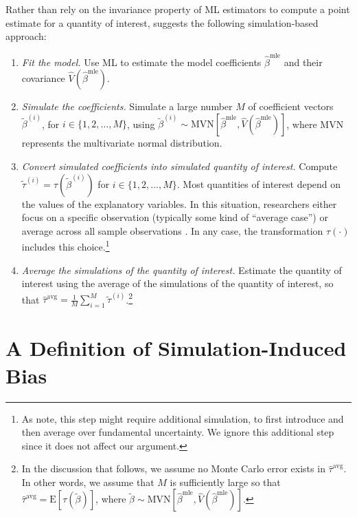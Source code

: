 \documentclass[11pt]{article}
\begin{document}
Rather than rely on the invariance property of ML estimators to compute a point estimate for a quantity of interest, \cite{KingTomzWittenberg2000} suggests the following simulation-based approach:\vspace{.1in}
\begin{enumerate}
\item \textit{Fit the model.}
Use ML to estimate the model coefficients $\hat{\beta}^{\text{mle}}$ and their covariance $\hat{V} \left( \hat{\beta}^{\text{mle}} \right)$.
\item \textit{Simulate the coefficients.}
Simulate a large number $M$ of coefficient vectors $\tilde{\beta}^{(i)}$, for $i \in \{1, 2,\ldots, M\}$, using $\tilde{\beta}^{(i)} \sim \text{MVN} \left[ \hat{\beta}^{\text{mle}}, \hat{V} \left( \hat{\beta}^{\text{mle}} \right) \right]$, where MVN represents the multivariate normal distribution.
\item \textit{Convert simulated coefficients into simulated quantity of interest.}
Compute $\tilde{\tau}^{(i)} = \tau \left( \tilde{\beta}^{(i)} \right)$ for $i \in \{1, 2,\ldots, M\}$.
Most quantities of interest depend on the values of the explanatory variables. In this situation, researchers either focus on a specific observation (typically some kind of ``average case'') or average across all sample observations \citep{HanmerKalkan2013}. In any case, the transformation $\tau(\cdot)$ includes this choice.\footnote{As \cite{KingTomzWittenberg2000} note, this step might require additional simulation, to first introduce and then average over fundamental uncertainty. We ignore this additional step since it does not affect our argument.} \item \textit{Average the simulations of the quantity of interest.} Estimate the quantity of interest using the average of the simulations of the quantity of interest, so that $\hat{\tau}^{\text{avg}} = \frac{1}{M} \sum_{i = 1}^{M} \tilde{\tau}^{(i)}$.\footnote{In the discussion that follows, we assume no Monte Carlo error exists in $\hat{\tau}^{\text{avg}}$. In other words, we assume that $M$ is sufficiently large so that $\hat{\tau}^{\text{avg}} = \text{E}\left[ \tau \left(\tilde{\beta} \right) \right]$, where $\tilde{\beta} \sim \text{MVN} \left[ \hat{\beta}^{\text{mle}}, \hat{V} \left( \hat{\beta}^{\text{mle}} \right) \right]$.}\\
\end{enumerate}

\section*{A Definition of Simulation-Induced Bias}
\end{document}
